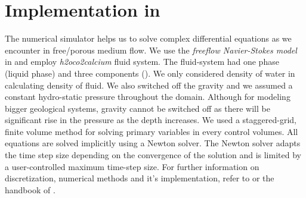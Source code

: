 \newpage
{}

\section{Implementation in \DuMuX}\label{ssec:impdum}
The numerical simulator \DuMuX helps us to solve complex differential equations as we encounter in free/porous medium flow. We use the \textit{freeflow Navier-Stokes model} in \DuMuX and employ \textit{h2oco2calcium} fluid system. The fluid-system had one phase (liquid phase) and three components (). We only considered density of water in calculating density of fluid. We also switched off the gravity and we assumed a constant hydro-static pressure throughout the domain. Although for modeling bigger geological systems, gravity cannot be switched off as there will be significant rise in the pressure as the depth increases. We used a staggered-grid, finite volume method for solving primary variables in every control volumes. All equations are solved implicitly using a Newton solver. The Newton solver adapts the time step size depending on the convergence of the solution and is limited by a user-controlled maximum time-step size. For further information on discretization, numerical methods and it's implementation, refer to \cite{Koch2020} or the handbook of \DuMuX \cite{Kochetal2020Dumux}.


